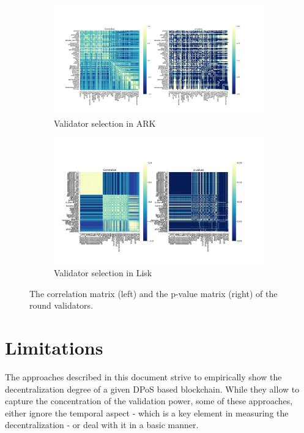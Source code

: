 \documentclass{article}
\begin{document}
\begin{figure}
     \centering
     \begin{subfigure}[b]{\textwidth}
         \centering
         \includegraphics[width=\textwidth]{figures/ARKWeekReal.png}
         \caption{Validator selection in ARK}
         \label{fig:CORRARK}
     \end{subfigure}
     \hfill
     \begin{subfigure}[b]{\textwidth}
         \centering
         \includegraphics[width=\textwidth]{figures/LISKWeekReal.png}
         \caption{Validator selection in Lisk}
         \label{fig:CORRLISK}
     \end{subfigure}
        \caption{The correlation matrix (left) and the p-value matrix (right) of the round validators.}
        \label{fig:three graphs}
\end{figure}


\section{Limitations}
The approaches described in this document strive to empirically show the decentralization degree of a given DPoS based blockchain. While they allow to capture the concentration of the validation power, some of these approaches, either ignore the temporal aspect - which is a key element in measuring the decentralization - or deal with it in a basic manner.
\end{document}
